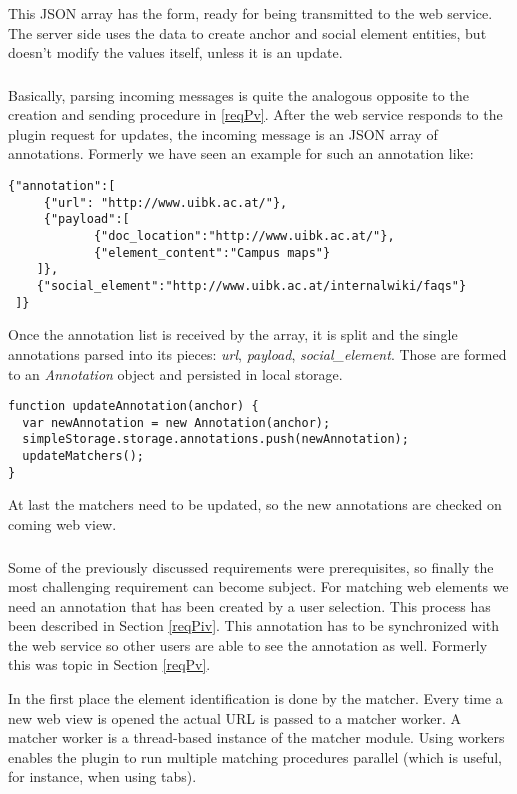 This JSON array has the form, ready for being transmitted to the web service. The server side uses the data to create anchor and social element entities, but doesn't modify the values itself, unless it is an update. 

\subsubsection[Parsing Incoming Messages]{\reqPvi}\label{reqPvi}
Basically, parsing incoming messages is quite the analogous opposite to the creation and sending procedure in \ref{reqPv}. After the web service responds to the plugin request for updates, the incoming message is an JSON array of annotations. Formerly we have seen an example for such an annotation like:
\begin{lstlisting}
{"annotation":[
	 {"url": "http://www.uibk.ac.at/"},
	 {"payload":[
 			{"doc_location":"http://www.uibk.ac.at/"},
 			{"element_content":"Campus maps"}
 	]},
 	{"social_element":"http://www.uibk.ac.at/internalwiki/faqs"}
 ]}
\end{lstlisting}
Once the annotation list is received by the array, it is split and the single annotations parsed into its pieces: \textit{url}, \textit{payload}, \textit{social\_element}. Those are formed to an \textit{Annotation} object and persisted in local storage. 
\begin{lstlisting}
function updateAnnotation(anchor) {
  var newAnnotation = new Annotation(anchor);  
  simpleStorage.storage.annotations.push(newAnnotation);
  updateMatchers();
}
\end{lstlisting}
At last the matchers need to be updated, so the new annotations are checked on coming web view. 

\subsubsection[Web Element Identification]{\reqPvii}
Some of the previously discussed requirements were prerequisites, so finally the most challenging requirement can become subject. 
For matching web elements we need an annotation that has been created by a user selection. This process has been described in Section \ref{reqPiv}. This annotation has to be synchronized with the web service so other users are able to see the annotation as well. Formerly this was topic in Section \ref{reqPv}. 

In the first place the element identification is done by the matcher. Every time a new web view is opened the actual URL is passed to a matcher worker. A matcher worker is a thread-based instance of the matcher module. Using workers enables the plugin to run multiple matching procedures parallel (which is useful, for instance, when using tabs). 


